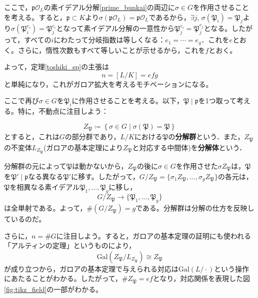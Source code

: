 ここで，$\mathfrak{p}\mathcal{O}_L$の素イデアル分解\eqref{prime_bunkai}の両辺に$\sigma\in G$を作用させることを考える。すると，$\mathfrak{p}\subset K$より$\sigma(\mathfrak{p}\mathcal{O}_L)=\mathfrak{p}\mathcal{O}_L$であるから，$\exists j,\, \sigma(\mathfrak{P}_i)=\mathfrak{P}_j$より$\sigma(\mathfrak{P}_i^{e_i})=\mathfrak{P}_j^{e_i}$となって素イデアル分解の一意性から$\mathfrak{P}_j^{e_i}=\mathfrak{P}_j^{e_j}$となる。したがって，すべての$i$にわたって分岐指数は等しくなる：$e_1=\cdots=e_g$．これを$e$とおく。さらに，惰性次数もすべて等しいことが示せるから，これを$f$とおく。

よって，定理\ref{toshiki_sp}の主張は
\begin{equation}\label{toshiki_sp_galois}
n=[L/K]=efg
\end{equation}と単純になり，これがガロア拡大を考えるモチベーションになる。

ここで再び$\sigma\in G$を$\mathfrak{P}_i$に作用させることを考える。以下，$\mathfrak{P}\mid\mathfrak{p}$を1つ取って考える。特に，不動点に注目しよう：
\begin{dfn}
    \[
    Z_{\mathfrak{P}}\coloneq\left\{\sigma\in G\mid\sigma(\mathfrak{P})=\mathfrak{P}\right\}
    \]とすると，これは$G$の部分群であり，$L/K$における$\mathfrak{P}$の\textbf{分解群}という．また，$Z_{\mathfrak{P}}$の不変体$L_{Z_{\mathfrak{P}}}$(ガロアの基本定理により$Z_{\mathfrak{P}}$と対応する中間体)を\textbf{分解体}という．
\end{dfn}
分解群の元によって$\mathfrak{P}$は動かないから，$Z_{\mathfrak{P}}$の後に$\sigma\in G$を作用させた$\sigma Z_{\mathfrak{P}}$は，$\mathfrak{P}$を$\mathfrak{P'}\mid\mathfrak{p}$なる異なる$\mathfrak{P'}$に移す。したがって，$G/{Z_{\mathfrak{P}}}=\{\sigma_1Z_{\mathfrak{P}},\ldots,\sigma_gZ_{\mathfrak{P}}\}$の各元は，$\mathfrak{P}$を相異なる素イデアル$\mathfrak{P}_1,\ldots,\mathfrak{P}_g$に移し，
\begin{equation}\label{zentan_zp}
G/{Z_{\mathfrak{P}}}\rightarrow\{\mathfrak{P}_1,\ldots,\mathfrak{P}_g\}
\end{equation}
は全単射である。よって，$\# (G/Z_{\mathfrak{P}})=g$である。分解群は分解の仕方を反映しているのだ。

さらに，$n=\# G$に注目しよう。すると，ガロアの基本定理の証明にも使われる「アルティンの定理」というものにより，
\begin{equation}\label{dokei_galois_artin}
\mathrm{Gal}(Z_{\mathfrak{P}}/{L_{Z_{\mathfrak{P}}}})\cong Z_{\mathfrak{P}}
\end{equation}
が成り立つから，ガロアの基本定理で与えられる対応は$\mathrm{Gal}(L/\cdot)$という操作にあたることがわかる。したがって，$\# Z_{\mathfrak{P}}=ef$となり，対応関係を表現した図\ref{fig:tikz_field}の一部がわかる。

